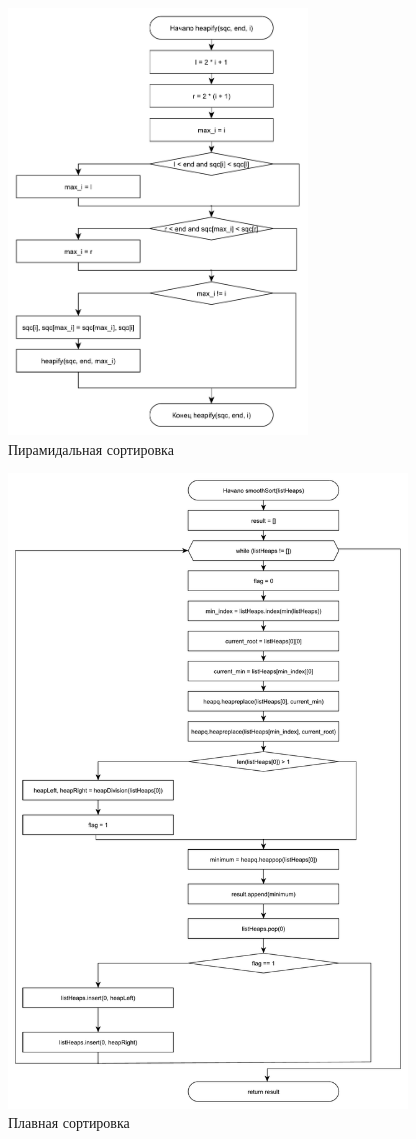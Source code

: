 \documentclass[12pt,a4paper]{scrartcl}
\begin{document}
\begin{figure}[h!]
	\centering
	\includegraphics[width=300px]{21.pdf}
	\caption{Пирамидальная сортировка}
	\label{graph2.3}
\end{figure}

\begin{figure}[h!]
	\centering
	\includegraphics[width=400px]{3.pdf}
	\caption{Плавная сортировка}
	\label{graph2.4}
\end{figure}
\end{document}
